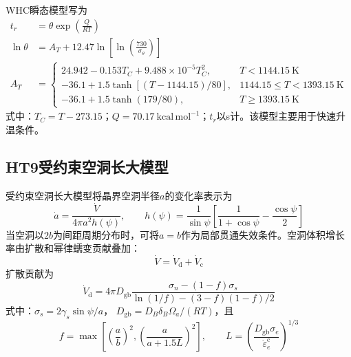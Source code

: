 WHC瞬态模型写为\cite{HuangTransientFailureBehavior1994}
\begin{equation}
	\label{eq:appendix_ht9_whc_failure_model}
	\begin{aligned}
		t_r&=\theta\exp\!\left(\frac{Q}{RT}\right)\\
		\ln\theta
		&=A_T+12.47\ln\!\left[
		\ln\!\left(\frac{730}{\sigma_\theta}\right)
		\right]\\
		A_T&=
		\begin{cases}
			24.942-0.153T_C
			+9.488\times10^{-5}T_C^2,
			&T<1144.15\ \mathrm{K}\\
			-36.1+1.5\tanh[(T-1144.15)/80],
			&1144.15\leq T<1393.15\ \mathrm{K}\\
			-36.1+1.5\tanh(179/80),
			&T\geq1393.15\ \mathrm{K}
		\end{cases}
	\end{aligned}
\end{equation}
式中：$T_C=T-273.15$；$Q=70.17\ \mathrm{kcal\,mol^{-1}}$；$t_r$以s计。该模型主要用于快速升温条件。

\subsection{HT9受约束空洞长大模型}

受约束空洞长大模型将晶界空洞半径$a$的变化率表示为\cite{TVERGAARD1985447,KARAHAN2010283}
\begin{equation}
	\dot a
	=\frac{\dot V}{4\pi a^2h(\psi)},
	\qquad
	h(\psi)
	=\frac{1}{\sin\psi}
	\left[
	\frac{1}{1+\cos\psi}-\frac{\cos\psi}{2}
	\right]
	\label{eq:appendix_ht9_cavity_radius_rate}
\end{equation}
当空洞以$2b$为间距周期分布时，可将$a=b$作为局部贯通失效条件。空洞体积增长率由扩散和幂律蠕变贡献叠加：
\begin{equation}
	\dot V=\dot V_{\mathrm d}+\dot V_{\mathrm c}
	\label{eq:appendix_ht9_cavity_volume_rate}
\end{equation}
扩散贡献为
\begin{equation}
	\dot V_{\mathrm d}
	=4\pi D_{\mathrm{gb}}
	\frac{\sigma_n-(1-f)\sigma_s}
	{\ln(1/f)-(3-f)(1-f)/2}
	\label{eq:appendix_ht9_diffusional_cavity_growth}
\end{equation}
式中：$\sigma_s=2\gamma_s\sin\psi/a$，
$D_{\mathrm{gb}}=D_B\delta_B\Omega_a/(RT)$，且
\begin{equation}
	f=\max\!\left[
	\left(\frac{a}{b}\right)^2,
	\left(\frac{a}{a+1.5L}\right)^2
	\right],
	\qquad
	L=\left(\frac{D_{\mathrm{gb}}\sigma_e}
	{\dot\varepsilon_e^{\mathrm c}}\right)^{1/3}
	\label{eq:appendix_ht9_cavity_area_fraction}
\end{equation}

